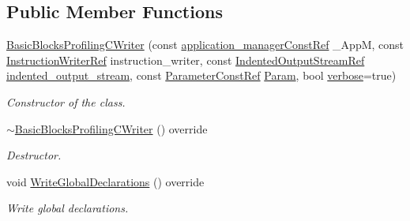 \subsection*{Public Member Functions}
\begin{DoxyCompactItemize}
\item 
\hyperlink{classBasicBlocksProfilingCWriter_a98132f12de7228626ad6444f12ed84cc}{Basic\+Blocks\+Profiling\+C\+Writer} (const \hyperlink{application__manager_8hpp_abb985163a2a3fb747f6f03b1eaadbb44}{application\+\_\+manager\+Const\+Ref} \+\_\+\+AppM, const \hyperlink{instruction__writer_8hpp_a40ea26c38a2909ba48f88f997144b260}{Instruction\+Writer\+Ref} instruction\+\_\+writer, const \hyperlink{indented__output__stream_8hpp_ab32278e11151ef292759c88e99b77feb}{Indented\+Output\+Stream\+Ref} \hyperlink{classCWriter_ac6d016436e065c31dd5152a7cc30e507}{indented\+\_\+output\+\_\+stream}, const \hyperlink{Parameter_8hpp_a37841774a6fcb479b597fdf8955eb4ea}{Parameter\+Const\+Ref} \hyperlink{classCWriter_a3555d61ac3540440862ed211800b80be}{Param}, bool \hyperlink{classCWriter_a8d5b6fe4a045d7e9ca997a566274cdb5}{verbose}=true)
\begin{DoxyCompactList}\small\item\em Constructor of the class. \end{DoxyCompactList}\item 
\hyperlink{classBasicBlocksProfilingCWriter_a38f377ad07a21acc9917fb4231fbff26}{$\sim$\+Basic\+Blocks\+Profiling\+C\+Writer} () override
\begin{DoxyCompactList}\small\item\em Destructor. \end{DoxyCompactList}\item 
void \hyperlink{classBasicBlocksProfilingCWriter_a96cb6c4a5df56ae5f5b5e65c73e6796d}{Write\+Global\+Declarations} () override
\begin{DoxyCompactList}\small\item\em Write global declarations. \end{DoxyCompactList}\end{DoxyCompactItemize}
